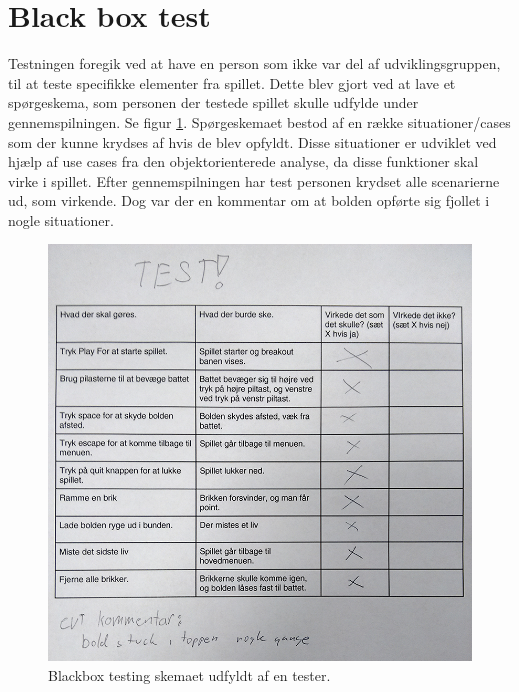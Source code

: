 
\section{Black box test}
Testningen foregik ved at have en person som ikke var del af udviklingsgruppen, til at teste specifikke elementer fra spillet. Dette blev gjort ved at lave et spørgeskema, som personen der testede spillet skulle udfylde under gennemspilningen. Se figur \ref{dia:blackbox1}. Spørgeskemaet bestod af en række situationer/cases som der kunne krydses af hvis de blev opfyldt. Disse situationer er udviklet ved hjælp af use cases fra den objektorienterede analyse, da disse funktioner skal virke i spillet. Efter gennemspilningen har test personen krydset alle scenarierne ud, som virkende. Dog var der en kommentar om at bolden opførte sig fjollet i nogle situationer.

\begin{figure}
	\begin{center}
		\caption{Blackbox testing skemaet udfyldt af en tester.}
		\label{dia:blackbox1}
		\includegraphics[width=0.98\linewidth]{pictures/testing/BlackboxTestArkBilag}
		\end{center}
\end{figure}